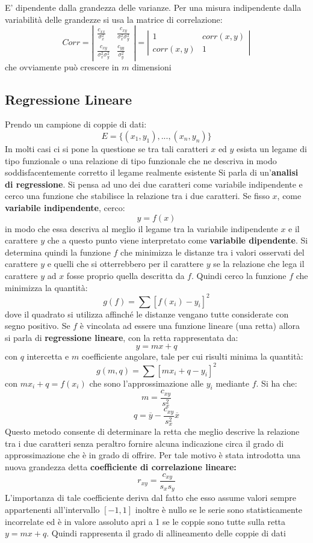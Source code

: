 \documentclass[a4paper,12pt, oneside]{book}
\begin{document}
E’ dipendente dalla grandezza delle varianze.
Per una misura indipendente dalla variabilità delle grandezze si usa la
matrice di correlazione:
$$Corr=\left|\begin{matrix}
\frac{c_{xx}}{\sigma_x^2} & \frac{c_{xy}}{\sigma_x^2\sigma_y^2} \\
\frac{c_{xy}}{\sigma_x^2\sigma_y^2}   & \frac{c_{yy}}{\sigma_y^2} 
\end{matrix}\right|=\left|\begin{matrix}
1 & corr(x,y)\\
corr(x,y) & 1
\end{matrix}\right|$$
che ovviamente può crescere in $m$ dimensioni
\subsection{Regressione Lineare}
Prendo un campione di coppie di dati:
$$E=\{(x_1,y_1),...,(x_n,y_n)\}$$
In molti casi ci si pone la questione se tra tali caratteri $x$ ed $y$ esista un legame di tipo funzionale o una relazione di tipo funzionale che ne descriva in modo
soddisfacentemente corretto il legame realmente esistente Si parla di un'\textbf{analisi di regressione}. Si pensa ad uno dei due caratteri come variabile indipendente e cerco una funzione che stabilisce la relazione tra i due caratteri. Se fisso $x$, come \textbf{variabile indipendente}, cerco:
$$y=f(x)$$
in modo che essa descriva al meglio il legame tra la variabile indipendente $x$ e il carattere $y$ che a questo punto viene interpretato come \textbf{variabile dipendente}. Si determina quindi la funzione $f$ che minimizza le distanze tra i valori
osservati del carattere $y$ e quelli che si otterrebbero per il carattere $y$ se la relazione che lega il carattere $y$ ad $x$ fosse proprio quella descritta da $f$. Quindi cerco la funzione $f$ che minimizza la quantità:
$$g(f)=\sum[f(x_i)-y_i]^2$$
dove il quadrato si utilizza affinché le distanze vengano tutte considerate con segno positivo. Se $f$ è vincolata ad essere una funzione lineare (una retta) allora si parla di \textbf{regressione lineare}, con la retta rappresentata da:
$$y=mx+q$$
con $q$ intercetta e $m$ coefficiente angolare, tale per cui risulti minima la quantità:
$$g(m,q)=\sum[mx_i+q-y_i]^2$$
con $mx_i+q=f(x_i)$ che sono l'approssimazione alle $y_i$ mediante $f$. Si ha che:
$$m=\frac{c_{xy}}{s^2_x}$$
$$q=\overline{y}-\frac{c_{xy}}{s_x^2}\overline{x}$$
Questo metodo consente di determinare la retta che meglio descrive la relazione tra i due caratteri senza peraltro fornire alcuna indicazione circa il grado di approssimazione che è in grado di offrire. Per tale motivo è stata introdotta una nuova grandezza detta \textbf{coefficiente di correlazione lineare:}
$$r_{xy}=\frac{c_{xy}}{s_xs_y}$$
L'importanza di tale coefficiente deriva dal fatto che esso assume valori sempre
appartenenti all'intervallo $[-1, 1]$ inoltre è nullo se le serie sono statisticamente incorrelate ed è in valore assoluto apri a 1 se le coppie sono tutte sulla retta $y=mx+q$. Quindi rappresenta il grado di allineamento delle coppie di dati
\end{document}
